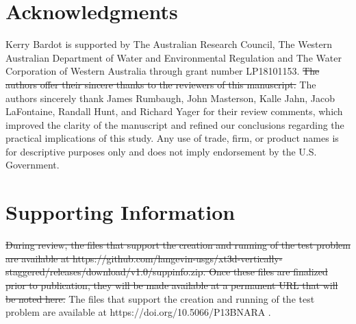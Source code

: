 \documentclass{article}
\begin{document}
\section*{Acknowledgments}
Kerry Bardot is supported by The Australian Research Council, The Western Australian Department of Water and Environmental Regulation and The Water Corporation of Western Australia through grant number LP18101153. {\color{red} \sout{The authors offer their sincere thanks to the reviewers of this manuscript. }The authors sincerely thank James Rumbaugh, John Masterson, Kalle Jahn, Jacob LaFontaine, Randall Hunt, and Richard Yager for their review comments, which improved the clarity of the manuscript and refined our conclusions regarding the practical implications of this study. Any use of trade, firm, or product names is for descriptive purposes only and does not imply endorsement by the U.S. Government.}

\section*{Supporting Information}
{\color{red} \sout{During review, the files that support the creation and running of the test problem are available at https://github.com/langevin-usgs/xt3d-vertically-staggered/releases/download/v1.0/suppinfo.zip. Once these files are finalized prior to publication, they will be made available at a permanent URL that will be noted here.}}{\color{red} The files that support the creation and running of the test problem are available at https://doi.org/10.5066/P13BNARA \citep{suppinfodatarelease}.}





\end{document}

